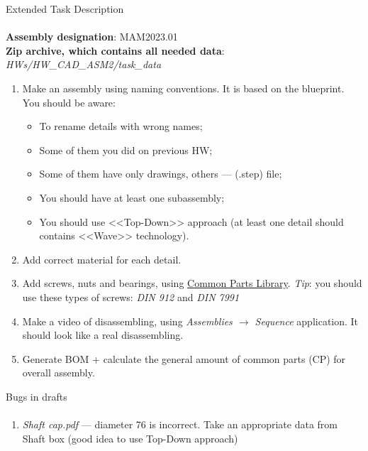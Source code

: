 \documentclass[aspectratio=169]{beamer}
\begin{document}
\begin{frame}[t]{Extended Task Description}
\framesubtitle{}
\vspace{-0.4cm}
\footnotesize
    \textbf{Assembly designation}: MAM2023.01 \\ 
    \textbf{Zip archive, which contains all needed data}: \textit{HWs/HW\_CAD\_ASM2/task\_data}
    \vspace{-0.25cm}
    \begin{enumerate}
        \item Make an assembly using naming conventions. It is based on the blueprint. You should be aware:
        \begin{itemize}
            \footnotesize
            \item To rename details with wrong names;
            \item Some of them you did on previous HW;
            \item Some of them have only drawings, others --- (.step) file;
            \item You should have at least one subassembly;
            \item You should use <<Top-Down>> approach (at least one detail should contains <<Wave>> technology).
        \end{itemize}
        \item Add correct material for each detail.
        \item Add screws, nuts and bearings, using \href{https://www.mcmaster.com/}{Common Parts Library}. \textit{Tip}: you should use these types of screws: \textit{DIN 912} and \textit{DIN 7991}
        \item Make a video of disassembling, using \textit{Assemblies $\rightarrow$ Sequence} application. It should look like a real disassembling.
        \item Generate BOM + calculate the general amount of common parts (CP) for overall assembly.
    \end{enumerate}
\end{frame}

\begin{frame}[t]{Bugs in drafts}
\framesubtitle{}
    \begin{enumerate}
        \item \textit{Shaft cap.pdf} --- diameter 76 is incorrect. Take an appropriate data from Shaft box (good idea to use Top-Down approach)
    \end{enumerate}
\end{frame}
\end{document}
